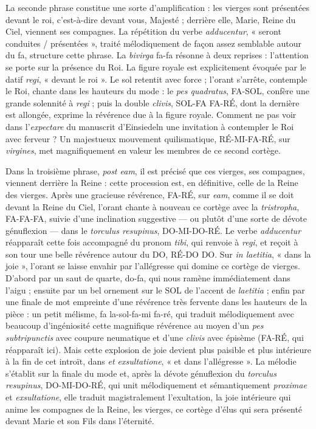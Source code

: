 \documentclass[Session2026.tex]{subfiles}
\begin{document}
La seconde phrase constitue une sorte d'amplification : les vierges sont
présentées devant le roi, c'est-à-dire devant vous, Majesté ; derrière
elle, Marie, Reine du Ciel, viennent ses compagnes. La répétition du
verbe \emph{adducentur}, « seront conduites / présentées », traité
mélodiquement de façon assez semblable autour du fa, structure cette
phrase. La \emph{bivirga} fa-fa résonne à deux reprises : l'attention se
porte sur la présence du Roi. La figure royale est explicitement évoquée
par le datif \emph{regi}, « devant le roi ». Le sol retentit avec force
; l'orant s'arrête, contemple le Roi, chante dans les hauteurs du mode :
le \emph{pes quadratus}, FA-SOL, confère une grande solennité à
\emph{regi} ; puis la double \emph{clivis}, SOL-FA FA-RÉ, dont la
dernière est allongée, exprime la révérence due à la figure royale.
Comment ne pas voir dans l'\emph{expectare} du manuscrit d'Einsiedeln
une invitation à contempler le Roi avec ferveur ? Un majestueux
mouvement quilismatique, RÉ-MI-FA-RÉ, sur \emph{virgines}, met
magnifiquement en valeur les membres de ce second cortège.

Dans la troisième phrase, \emph{post eam}, il est précisé que ces
vierges, ses compagnes, viennent derrière la Reine : cette procession
est, en définitive, celle de la Reine des vierges. Après une gracieuse
révérence, FA-RÉ, sur \emph{eam}, comme il se doit devant la Reine du
Ciel, l'orant chante à nouveau ce cortège avec la \emph{tristropha},
FA-FA-FA, suivie d'une inclination suggestive --- ou plutôt d'une sorte
de dévote génuflexion --- dans le \emph{torculus resupinus},
DO-MI-DO-RÉ. Le verbe \emph{adducentur} réapparaît cette fois accompagné
du pronom \emph{tibi}, qui renvoie à \emph{regi}, et reçoit à son tour
une belle révérence autour du DO, RÉ-DO DO. Sur \emph{in laetitia}, «
dans la joie », l'orant se laisse envahir par l'allégresse qui domine ce
cortège de vierges. D'abord par un saut de quarte, do-fa, qui nous
ramène immédiatement dans l'aigu ; ensuite par un bel ornement sur le
SOL de l'accent de \emph{laetitia} ; enfin par une finale de mot
empreinte d'une révérence très fervente dans les hauteurs de la pièce :
un petit mélisme, fa la-sol-fa-mi fa-ré, qui traduit mélodiquement avec
beaucoup d'ingéniosité cette magnifique révérence au moyen d'un
\emph{pes subtripunctis} avec coupure neumatique et d'une \emph{clivis}
avec épisème (FA-RÉ, qui réapparaît ici). Mais cette explosion de joie
devient plus paisible et plus intérieure à la fin de cet introït, dans
\emph{et exsultatione}, « et dans l'allégresse ». La mélodie s'établit
sur la finale du mode et, après la dévote génuflexion du \emph{torculus
resupinus}, DO-MI-DO-RÉ, qui unit mélodiquement et sémantiquement
\emph{proximae} et \emph{exsultatione}, elle traduit magistralement
l'exultation, la joie intérieure qui anime les compagnes de la Reine,
les vierges, ce cortège d'élus qui sera présenté devant Marie et son
Fils dans l'éternité.
\end{document}
